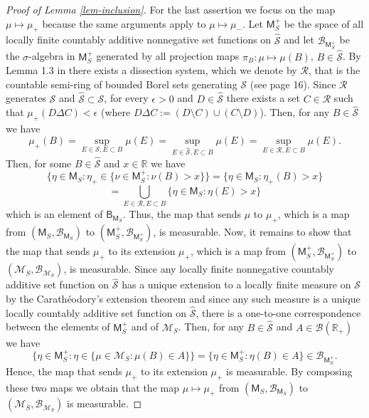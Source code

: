 \documentclass{article}
\theoremstyle{plain}
\theoremstyle{remark}
\begin{document}
\begin{proof}[Proof of Lemma \ref{lem-inclusion}]
	For the last assertion we focus on the map $\mu\mapsto\mu_+$ because the same arguments apply to $\mu\mapsto\mu_-$. Let $\mathsf{M}_S^+$ be the space of all locally finite countably additive nonnegative set functions on $\hat{\mathcal{S}}$ and let $\mathcal{B}_{\mathsf{M}_S^+}$ be the $\sigma$-algebra in $\mathsf{M}_S^+$ generated by all projection maps $\pi_{B}:\mu\mapsto\mu(B)$, $B\in\hat{\mathcal{S}}$. By Lemma 1.3 in \cite{Kallenberg2} there exists a dissection system, which we denote by $\mathcal{R}$, that is the countable semi-ring of bounded Borel sets generating $\mathcal{S}$ (see \cite{Kallenberg2} page 16). Since $\mathcal{R}$ generates $\mathcal{S}$ and $\hat{\mathcal{S}}\subset\mathcal{S}$, for every $\epsilon>0$ and $D\in\hat{\mathcal{S}}$ there exists a set $C\in\mathcal{R}$ such that $\mu_+(D\Delta C)<\epsilon$ (where $D\Delta C:=(D\setminus C)\cup(C\setminus D)$). Then, for any $B\in\hat{\mathcal{S}}$ we have
	\begin{equation*}
		\mu_+(B)=\sup_{E\in \mathcal{S}, E\subset B}\mu(E)= \sup_{E\in \hat{\mathcal{S}}, E\subset B}\mu(E)=\sup_{E\in \mathcal{R}, E\subset B}\mu(E).
	\end{equation*}
	Then, for some $B\in\hat{\mathcal{S}}$ and $x\in\mathbb{R}$ we have 
	\begin{equation*}
		\{\eta\in\mathsf{M}_S:\eta_+\in \{\nu\in\mathsf{M}^+_S:\nu(B)>x\} \}=	\{\eta\in\mathsf{M}_S:\eta_+(B)>x\}
	\end{equation*}
	\begin{equation*}
		=\bigcup_{E\in \mathcal{R}, E\subset B}	\{\eta\in\mathsf{M}_S:\eta(E)>x\}
	\end{equation*}
	which is an element of $\mathsf{B}_{\mathsf{M}_S}$. Thus, the map that sends $\mu$ to $\mu_+$, which is a map from $(\mathsf{M}_{S},\mathcal{B}_{\mathsf{M}_S})$  to $(\mathsf{M}^+_{S},\mathcal{B}_{\mathsf{M}^+_S})$,  is measurable. Now, it remains to show that the map that sends $\mu_+$ to its extension $\mu_+$, which is a map from $(\mathsf{M}^+_{S},\mathcal{B}_{\mathsf{M}^+_S})$ to $(\mathcal{M}_{S},\mathcal{B}_{\mathcal{M}_S})$, is measurable. Since any locally finite nonnegative countably additive set function on $\hat{\mathcal{S}}$ has a unique extension to a locally finite measure on $\mathcal{S}$ by the Carath\'{e}odory's extension theorem and since any such measure is a unique locally countably additive set function on $\hat{\mathcal{S}}$, there is a one-to-one correspondence between the elements of $\mathsf{M}^+_S$ and of $\mathcal{M}_S$. Then, for any $B\in\hat{\mathcal{S}}$ and $A\in\mathcal{B}(\mathbb{R}_+)$ we have
	\begin{equation*}
		\{\eta\in\mathsf{M}^+_S:\eta\in \{\mu\in\mathcal{M}_S:\mu(B)\in A\} \}=	\{\eta\in\mathsf{M}^+_S:\eta(B)\in A\}\in \mathcal{B}_{\mathsf{M}^+_S}.
	\end{equation*}
	Hence, the map that sends $\mu_+$ to its extension $\mu_+$ is measurable. By composing these two maps we obtain that the map $\mu\mapsto\mu_+$ from $(\mathsf{M}_{S},\mathcal{B}_{\mathsf{M}_S})$ to $(\mathcal{M}_{S},\mathcal{B}_{\mathcal{M}_S})$ is measurable.
\end{proof}
\end{document}
